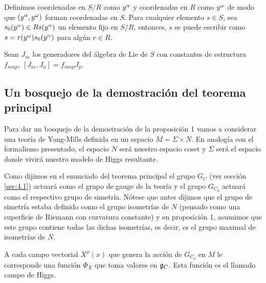 Definimos coordenadas en $S/R$ como $y^\alpha$ y coordenadas en $R$ como $y^\omega$ de modo que $(y^\alpha,y^\omega)$ forman coordenadas en $S$. Para cualquier elemento $s\in S$, sea $s_0(y^\alpha)\in Rs(y^\alpha)$ un elemento fijo en $S/R$, entonces, $s$ se puede escribir como $s=r(y^\omega)s_0(y^\alpha)$ para algún $r\in R$.

Sean $J_m$ los generadores del álgebra de Lie de $S$ con constantes de estructura $f_{mnp}$, $[J_m,J_n]=f_{mnp}J_p$. 

\subsection{Un bosquejo de la demostración del teorema principal}

Para dar un bosquejo de la demostración de la proposición 1 vamos a considerar una teoría de Yang-Mills definida en un espacio $M=\Sigma\times N$. En analogía con el formalismo presentado, el espacio $N$ será nuestro espacio coset y $\Sigma$ será el espacio donde vivirá nuestro modelo de Higgs resultante.

Como dijimos en el enunciado del teorema principal el grupo $G_C$ (ver sección \ref{sec:4.1}) actuará como el grupo de gauge de la teoría y el grupo $G_{C_0}$ actuará como el respectivo grupo de simetría. Nótese que antes dijimos que el grupo de simetría estaba definido como el grupo isometrías de $N$ (pensado como una superficie de Riemann con curvatura constante) y en proposición 1, asumimos que este grupo contiene todas las dichas isometrías, es decir, es el grupo maximal de isometrías de $N$.

A cada campo vectorial $X^\mu(x)$ que genera la acción de $G_{C_0}$ en $M$ le corresponde una función $\Phi_X$ que toma valores en $\mathfrak{g}_C$. Esta función es el llamado campo de Higgs.

